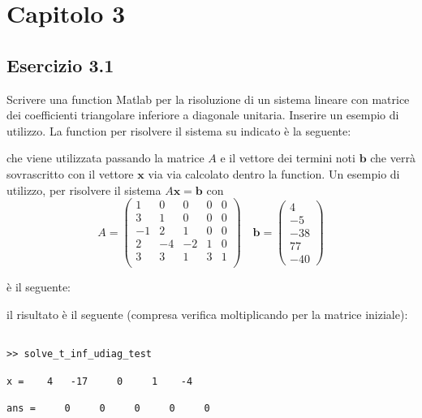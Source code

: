 \section{Capitolo 3}



	\subsection{Esercizio 3.1}

Scrivere una function Matlab per la risoluzione di un sistema lineare con matrice dei coefficienti triangolare inferiore a diagonale unitaria. Inserire un esempio di utilizzo.
\PP
La function per risolvere il sistema su indicato è la seguente:



che viene utilizzata passando la matrice $A$ e il vettore dei termini noti $\mathbf{b}$ che verrà sovrascritto con il vettore $\mathbf{x}$ via via calcolato dentro la function. 
Un esempio di utilizzo, per risolvere il sistema $A\mathbf{x}=\mathbf{b}$ con
	\[	
		A = 
		\begin{pmatrix}
			1&0&0&0&0 \\
			3&1&0&0&0\\
			-1&2&1&0&0\\
			2&-4&-2&1&0\\
			3&3&1&3&1\\
		\end{pmatrix}
		\quad 
		\mathbf{b}=
		\begin{pmatrix}	4 \\ -5 \\ -38 \\ 77 \\ -40 \end{pmatrix}
	\]
	
 è il seguente:
 


il risultato è il seguente (compresa verifica moltiplicando per la matrice iniziale):

\begin{lstlisting}[frame=single]

>> solve_t_inf_udiag_test

x =    4   -17     0     1    -4

ans =     0     0     0     0     0

\end{lstlisting}



